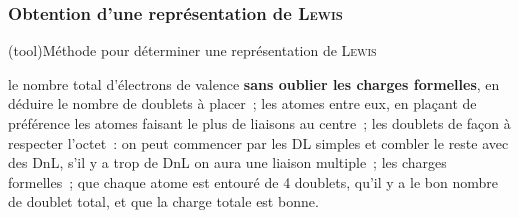 \documentclass[../../main/main.tex]{subfiles}
\begin{document}
\vspace{-15pt}
\subsubsection{Obtention d'une représentation de \textsc{Lewis}}
\begin{tcb*}(tool){Méthode pour déterminer une représentation de \textsc{Lewis}}
	\begin{enumerate}[label=\sqenumi]
		 le nombre total d'électrons de valence \textbf{sans oublier
			les charges formelles}, en déduire le nombre
		de doublets à placer~;
		 les atomes entre eux, en plaçant de préférence les atomes
		faisant le plus de liaisons au centre~;
		 les doublets de façon à respecter l'octet~: on peut commencer
		par les DL simples et combler le reste avec des DnL, s'il y a trop de
		DnL on aura une liaison multiple~;
		 les charges formelles~;
		 que chaque atome est entouré de 4 doublets, qu'il y a le
		bon nombre de doublet total, et que la charge totale est bonne.
	\end{enumerate}
\end{tcb*}
\end{document}
